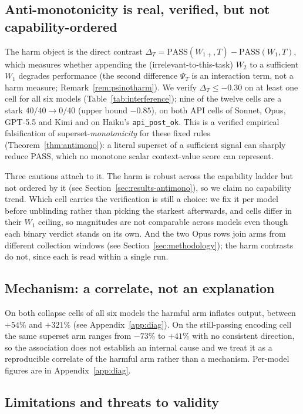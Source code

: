 \documentclass[11pt]{article}
\theoremstyle{plain}
\theoremstyle{definition}
\theoremstyle{remark}
\newcommand{\PASS}{\mathrm{PASS}}
\begin{document}
\subsection{Anti-monotonicity is real, verified, but not capability-ordered}
\label{sec:disc-antimono}

The harm object is the direct contrast $\Delta_T = \PASS(W_{1+},T) - \PASS(W_1,T)$, which measures
whether appending the (irrelevant-to-this-task) $W_2$ to a sufficient $W_1$ degrades performance
(the second difference $\Psi_T$ is an interaction term, not a harm measure;
Remark~\ref{rem:psinotharm}). We verify $\Delta_T \le -0.30$ on at least one cell for all six
models (Table~\ref{tab:interference}); nine of the twelve cells are a stark $40/40 \to 0/40$
(upper bound $-0.85$), on both API cells of Sonnet, Opus, GPT-5.5 and Kimi and on Haiku's
\texttt{api\_post\_ok}. This is a verified empirical falsification of
superset-\emph{monotonicity} for these fixed rules (Theorem~\ref{thm:antimono}): a literal
superset of a sufficient signal can
sharply reduce PASS, which no monotone scalar context-value score can represent.

Three cautions attach to it. The harm is robust across the capability ladder but not ordered by it
(see Section~\ref{sec:results-antimono}), so we claim no capability trend. Which cell carries the
verification is still a choice: we fix it per model before unblinding rather than picking the
starkest afterwards, and cells differ in their $W_1$ ceiling, so magnitudes are not comparable
across models even though each binary verdict stands on its own. And the two Opus rows join arms
from different collection windows (see Section~\ref{sec:methodology}); the harm contrasts do not,
since each is read within a single run.

\subsection{Mechanism: a correlate, not an explanation}
\label{sec:disc-mechanism}

On both collapse cells of all six models the harmful arm inflates output, between $+54\%$ and
$+321\%$ (see Appendix~\ref{app:diag}). On the still-passing encoding cell the same
superset arm ranges from $-73\%$ to $+41\%$ with no consistent direction, so the association does
not establish an internal cause and we treat it as a reproducible correlate of the harmful arm
rather than a
mechanism. Per-model figures are in Appendix~\ref{app:diag}.
\subsection{Limitations and threats to validity}
\label{sec:limitations}
\end{document}
